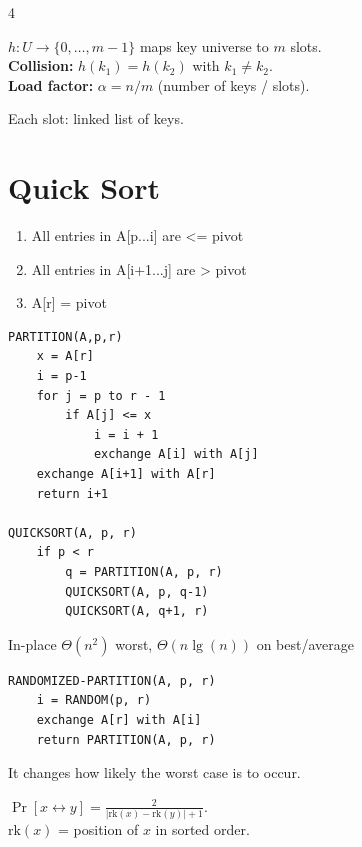 \documentclass[8pt,a4paper,landscape]{extarticle}
\begin{document}
\begin{multicols*}{4}
\begin{defn}[title=Hash function]
$h: U\to\{0,\ldots,m{-}1\}$ maps key universe to $m$ slots.\\
\textbf{Collision:} $h(k_1)=h(k_2)$ with $k_1\neq k_2$.\\
\textbf{Load factor:} $\alpha = n/m$ (number of keys / slots).
\end{defn}

\begin{prop}[title=Chaining (collision resolution)]
Each slot: linked list of keys.
\end{prop}

\section{Quick Sort}
\begin{thm}[title=Loop invariant of Partitioning]
\begin{enumerate}
  \item All entries in A[p...i] are <= pivot
  \item All entries in A[i+1...j] are > pivot
  \item A[r] = pivot
\end{enumerate}
\end{thm}

\begin{lstlisting}
PARTITION(A,p,r)
    x = A[r]
    i = p-1
    for j = p to r - 1
        if A[j] <= x
            i = i + 1
            exchange A[i] with A[j]
    exchange A[i+1] with A[r]
    return i+1

QUICKSORT(A, p, r)
    if p < r
        q = PARTITION(A, p, r)
        QUICKSORT(A, p, q-1)
        QUICKSORT(A, q+1, r)
\end{lstlisting}

\begin{prop}[title=Runtime]
In-place $\Theta(n^2)$ worst, $\Theta(n\lg(n))$ on best/average
\end{prop}

\begin{lstlisting}
RANDOMIZED-PARTITION(A, p, r)
    i = RANDOM(p, r)
    exchange A[r] with A[i]
    return PARTITION(A, p, r)
\end{lstlisting}
It changes how likely the worst case is to occur.

\begin{prop}[title=Probability x compared to y]
$\Pr[x \leftrightarrow y] = \frac{2}{|\text{rk}(x)-\text{rk}(y)|+1}$.\\
$\text{rk}(x)$ = position of $x$ in sorted order.
\end{prop}


\end{multicols*}
\end{document}

